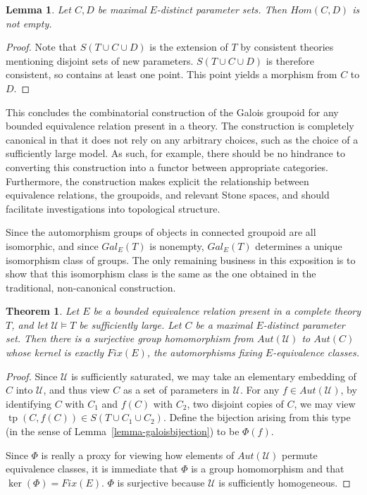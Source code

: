 \documentclass[letterpaper,twoside]{article}
\newtheorem{theorem}{Theorem}[section]
\newtheorem{lemma}{Lemma}[theorem]
\theoremstyle{definition}
\theoremstyle{remark}
\DeclareMathOperator{\tp}{tp}
\begin{document}
\begin{lemma}\label{lemma-galoisconnected}
  Let \(C,D\) be maximal \(E\)-distinct parameter sets.  Then
  \(Hom(C,D)\) is not empty.
\end{lemma}
\begin{proof}
  Note that \(S(T \cup C \cup D)\) is the extension of \(T\) by
  consistent theories mentioning disjoint sets of new parameters.
  \(S(T \cup C \cup D)\) is therefore consistent, so contains at least
  one point.  This point yields a morphism from \(C\) to \(D\).
\end{proof}

This concludes the combinatorial construction of the Galois groupoid
for any bounded equivalence relation present in a theory.  The
construction is completely canonical in that it does not rely on any
arbitrary choices, such as the choice of a sufficiently large model.
As such, for example, there should be no hindrance to converting this
construction into a functor between appropriate categories.
Furthermore, the construction makes explicit the relationship between
equivalence relations, the groupoids, and relevant Stone spaces, and
should facilitate investigations into topological structure.

Since the automorphism groups of objects in connected groupoid are all
isomorphic, and since \(Gal_E(T)\) is nonempty, \(Gal_E(T)\)
determines a unique isomorphism class of groups.  The only remaining
business in this exposition is to show that this isomorphism class is
the same as the one obtained in the traditional, non-canonical
construction.

\begin{theorem}
  Let \(E\) be a bounded equivalence relation present in a complete
  theory \(T\), and let \(\mathcal{U} \models T\) be sufficiently
  large.  Let \(C\) be a maximal \(E\)-distinct parameter set.  Then
  there is a surjective group homomorphism from \(Aut(\mathcal{U})\)
  to \(Aut(C)\) whose kernel is exactly \(Fix(E)\), the automorphisms
  fixing \(E\)-equivalence classes.
\end{theorem}
\begin{proof}
  Since \(\mathcal{U}\) is sufficiently saturated, we may take an
  elementary embedding of \(C\) into \(\mathcal{U}\), and thus view
  \(C\) as a set of parameters in \(\mathcal{U}\).  For any \(f \in
  Aut(\mathcal{U})\), by identifying \(C\) with \(C_1\) and \(f(C)\)
  with \(C_2\), two disjoint copies of \(C\), we may view
  \(\tp(C,f(C)) \in S(T \cup C_1 \cup C_2)\).  Define the bijection
  arising from this type (in the sense of
  Lemma~\ref{lemma-galoisbijection}) to be \(\Phi(f)\).

  Since \(\Phi\) is really a proxy for viewing how elements of
  \(Aut(\mathcal{U})\) permute equivalence classes, it is immediate
  that \(\Phi\) is a group homomorphism and that \(\ker(\Phi) =
  Fix(E)\).  \(\Phi\) is surjective because \(\mathcal{U}\) is
  sufficiently homogeneous.
\end{proof}
\end{document}
